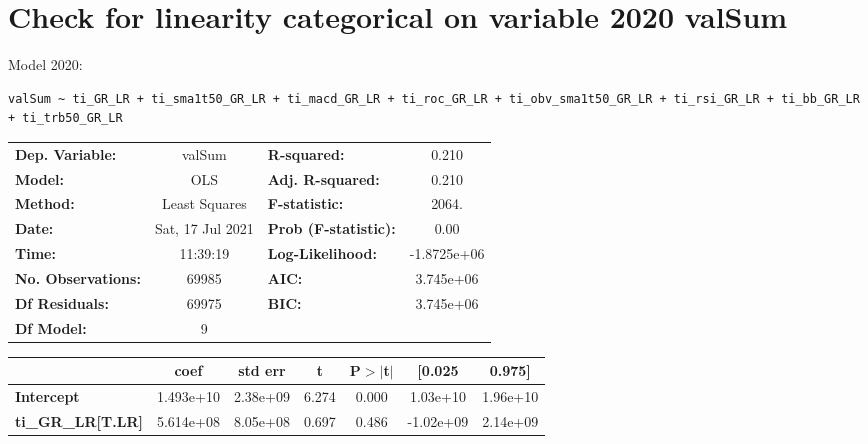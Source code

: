 \section{Check for linearity categorical on variable 2020 valSum}

Model 2020: \begin{verbatim}valSum ~ ti_GR_LR + ti_sma1t50_GR_LR + ti_macd_GR_LR + ti_roc_GR_LR + ti_obv_sma1t50_GR_LR + ti_rsi_GR_LR + ti_bb_GR_LR + ti_trb50_GR_LR\end{verbatim}

\begin{center}
\begin{tabular}{lclc}
\toprule
\textbf{Dep. Variable:}                 &      valSum      & \textbf{  R-squared:         } &      0.210   \\
\textbf{Model:}                         &       OLS        & \textbf{  Adj. R-squared:    } &      0.210   \\
\textbf{Method:}                        &  Least Squares   & \textbf{  F-statistic:       } &      2064.   \\
\textbf{Date:}                          & Sat, 17 Jul 2021 & \textbf{  Prob (F-statistic):} &      0.00    \\
\textbf{Time:}                          &     11:39:19     & \textbf{  Log-Likelihood:    } & -1.8725e+06  \\
\textbf{No. Observations:}              &       69985      & \textbf{  AIC:               } &  3.745e+06   \\
\textbf{Df Residuals:}                  &       69975      & \textbf{  BIC:               } &  3.745e+06   \\
\textbf{Df Model:}                      &           9      & \textbf{                     } &              \\
\bottomrule
\end{tabular}
\begin{tabular}{lcccccc}
                                        & \textbf{coef} & \textbf{std err} & \textbf{t} & \textbf{P$> |$t$|$} & \textbf{[0.025} & \textbf{0.975]}  \\
\midrule
\textbf{Intercept}                      &    1.493e+10  &     2.38e+09     &     6.274  &         0.000        &     1.03e+10    &     1.96e+10     \\
\textbf{ti\_GR\_LR[T.LR]}               &    5.614e+08  &     8.05e+08     &     0.697  &         0.486        &    -1.02e+09    &     2.14e+09     \\

\end{tabular}
\end{center}
